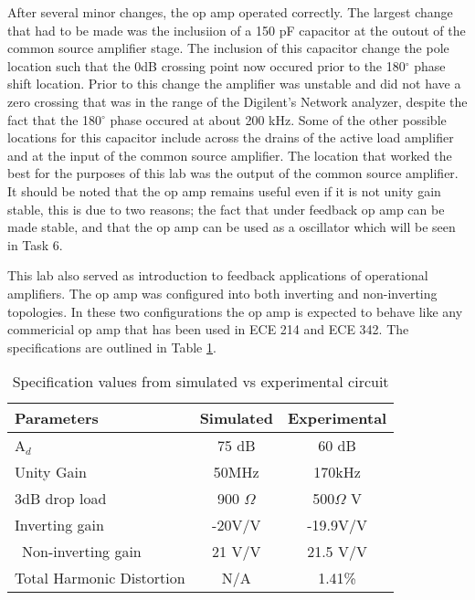 
After several minor changes, the op amp operated correctly. The largest change that had to be made was the inclusiion of a 150 pF capacitor at the outout of the common source amplifier stage. The inclusion of this capacitor change the pole location such that the 0dB crossing point now occured prior to the 180$^\circ$ phase shift location. Prior to this change the amplifier was unstable and did not have a zero crossing that was in the range of the Digilent's Network analyzer, despite the fact that the 180$^\circ$ phase occured at about 200 kHz. Some of the other possible locations for this capacitor include across the drains of the active load amplifier and at the input of the common source amplifier. The location that worked the best for the purposes of this lab was the output of the common source amplifier. It should be noted that the op amp remains useful even if it is not unity gain stable, this is due to two reasons; the fact that under feedback op amp can be made stable, and that the op amp can be used as a oscillator which will be seen in Task 6. 

 This lab also served as introduction to feedback applications of operational amplifiers. The op amp was configured into both inverting and non-inverting topologies. In these two configurations the op amp is expected to behave like any commericial op amp that has been used in ECE 214 and ECE 342. The specifications are outlined in Table \ref{tab:specs}.

\begin{table}[H]
	\centering
	\caption{Specification values from simulated vs experimental circuit}
	\label{tab:specs}
	\begin{tabular}{|l|c|c|} 
		\hline                      
		\textbf{Parameters} & Simulated & Experimental        \\ \hline
		A$_{d}$ & 75 dB      & 60 dB                                      \\ \hline
		Unity Gain &    50MHz      & 170kHz                    	   \\ \hline
		3dB drop load & 900 $\Omega$         & 500$\Omega$ V                              	       	       \\ \hline
		Inverting gain  & -20V/V                       &  -19.9V/V                        	   \\ \hline\
	Non-inverting gain & 21 V/V				& 21.5 V/V 	 \\ \hline
		Total Harmonic Distortion           & N/A         &    1.41\%                            \\ \hline
	

	\end{tabular}
\end{table}


